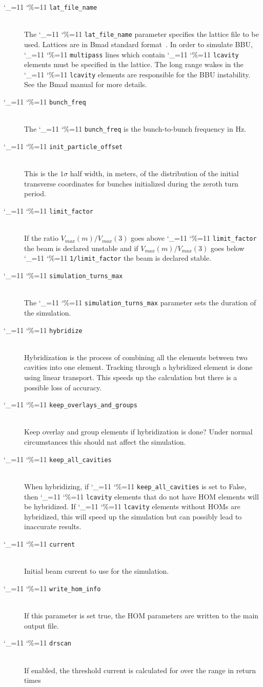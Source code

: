 \documentclass[11pt]{article}
\newcommand\ttcmd{\begingroup\catcode`\_=11 \catcode`\%=11 \dottcmd}
\newcommand\dottcmd[1]{\texttt{#1}\endgroup}
\newcommand{\vn}{\ttcmd}
\newcommand{\Newline}{\hfil \\}
\begin{document}
{  \begin{description}
  \item[\vn{lat_file_name}] \Newline
The \vn{lat_file_name} parameter specifies the lattice file to be
used.  Lattices are in Bmad standard format~\cite{ref:bmad}. In order
to simulate BBU, \vn{multipass} lines which contain \vn{lcavity}
elements must be specified in the lattice. The long range wakes in the
\vn{lcavity} elements are responsible for the BBU instability. See
the Bmad manual for more details.
  \item[\vn{bunch_freq}] \Newline
The \vn{bunch_freq} is the bunch-to-bunch frequency in Hz.
  \item[\vn{init_particle_offset}] \Newline
This is the $1\sigma$ half width, in meters, of the distribution of
the initial transverse coordinates for bunches initialized during the
zeroth turn period.
  \item[\vn{limit_factor}] \Newline
If the ratio $V_{max}(m)/V_{max}(3)$ goes above \vn{limit_factor} the
beam is declared unstable and if $V_{max}(m)/V_{max}(3)$ goes below
\vn{1/limit_factor} the beam is declared stable.
  \item[\vn{simulation_turns_max}] \Newline
The \vn{simulation_turns_max} parameter sets the duration of the simulation.
  \item[\vn{hybridize}] \Newline
Hybridization is the process of combining all the elements between
two cavities into one element. Tracking through a hybridized element
is done using linear transport. This speeds up the calculation but
there is a possible loss of accuracy.
  \item[\vn{keep_overlays_and_groups}] \Newline
Keep overlay and group elements if hybridization is done? 
Under normal circumstances this should nat affect the simulation.
  \item[\vn{keep_all_cavities}] \Newline
When hybridizing, if \vn{keep_all_cavities} is set to False, then
\vn{lcavity} elements that do not have HOM elements will be
hybridized. If \vn{lcavity} elements without HOMs are hybridized, this
will speed up the simulation but can possibly lead to inaccurate
results.
  \item[\vn{current}] \Newline
Initial beam current to use for the simulation.
  \item[\vn{write_hom_info}] \Newline
If this parameter is set true, the HOM parameters are written to the
main output file.
  \item[\vn{drscan}] \Newline
If enabled, the threshold current is calculated for over the range in return times

\end{description}}
\end{document}
